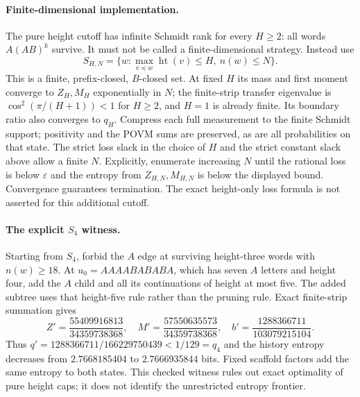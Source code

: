 \paragraph{Finite-dimensional implementation.}
The pure height cutoff has infinite Schmidt rank for every $H\ge2$: all words $A(AB)^k$ survive. It must not be called a finite-dimensional strategy. Instead use
\[
 S_{H,N}=\{w:\max_{v\preceq w}\operatorname{ht}(v)\le H,\ n(w)\le N\}.
\]
This is a finite, prefix-closed, $B$-closed set. At fixed $H$ its mass and first moment converge to $Z_H,M_H$ exponentially in $N$; the finite-strip transfer eigenvalue is $\cos^2(\pi/(H+1))<1$ for $H\ge2$, and $H=1$ is already finite. Its boundary ratio also converges to $q_H$. Compress each full measurement to the finite Schmidt support; positivity and the POVM sums are preserved, as are all probabilities on that state. The strict loss slack in the choice of $H$ and the strict constant slack above allow a finite $N$. Explicitly, enumerate increasing $N$ until the rational loss is below $\varepsilon$ and the entropy from $Z_{H,N},M_{H,N}$ is below the displayed bound. Convergence guarantees termination. The exact height-only loss formula is not asserted for this additional cutoff.

\paragraph{The explicit $S_4$ witness.}
Starting from $S_4$, forbid the $A$ edge at surviving height-three words with $n(w)\ge18$. At $u_0=AAAABABABA$, which has seven $A$ letters and height four, add the $A$ child and all its continuations of height at most five. The added subtree uses that height-five rule rather than the pruning rule. Exact finite-strip summation gives
\[
 Z'=\frac{55409916813}{34359738368},\quad
 M'=\frac{57550635573}{34359738368},\quad
 b'=\frac{1288366711}{103079215104}.
\]
Thus $q'=1288366711/166229750439<1/129=q_4$ and the history entropy decreases from $2.7668185404$ to $2.7666935844$ bits. Fixed scaffold factors add the same entropy to both states. This checked witness rules out exact optimality of pure height caps; it does not identify the unrestricted entropy frontier.

